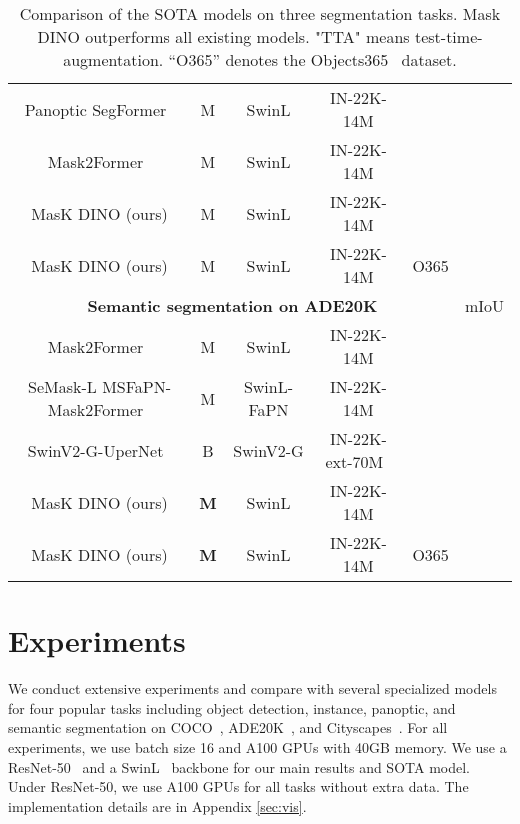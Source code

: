 \documentclass[10pt,twocolumn,letterpaper]{article}
\begin{document}
\begin{table*}[t]
\begin{adjustbox}{width=0.9\textwidth,center}
\begin{tabular}{c|c|c|c|c|cc}
        Panoptic SegFormer~\cite{li2021panoptic}& M & SwinL & IN-22K-14M &      & &   \\
         Mask2Former~\cite{cheng2021mask2former} & M & SwinL & IN-22K-14M &      &  &   \\
\hline
        MasK DINO (ours) & {M} & SwinL & IN-22K-14M &  &    \fontsize{7.0pt}{\baselineskip}\selectfont{(+0.6)} &   \\
MasK DINO (ours) & {M} & SwinL & IN-22K-14M & O365 &    \fontsize{7.0pt}{\baselineskip}\selectfont{(+1.6)} &   \\
        \midrule
        \multicolumn{5}{c}{{\textbf{Semantic segmentation on ADE20K}}}&\multicolumn{2}{c}{mIoU} \\
        \midrule
Mask2Former~\cite{cheng2021mask2former} & M & SwinL & IN-22K-14M  &      &  &   \\
SeMask-L MSFaPN-Mask2Former~\cite{jain2021semask} & M & SwinL-FaPN & IN-22K-14M &      & &   \\
        SwinV2-G-UperNet~\cite{liu2021swinv2} & B & SwinV2-G & IN-22K-ext-70M~\cite{liu2021swinv2} &  &    & \\
        \hline
        MasK DINO (ours) & \textbf{M} & SwinL & IN-22K-14M &  &     &   \\
        MasK DINO (ours) & \textbf{M} & SwinL & IN-22K-14M & O365 &     & \fontsize{7.0pt}{\baselineskip}\selectfont{(+0.9)}  \\
        \bottomrule
    \end{tabular}
    \end{adjustbox}
\caption{Comparison of the SOTA models on three segmentation tasks. Mask DINO outperforms all existing models. "TTA" means test-time-augmentation.
``O365''  denotes the  Objects365~\cite{shao2019objects365} dataset. 
    }
    \label{tab:sota}
    \vspace{-.3cm}
\end{table*}



%
 \section{Experiments}
We conduct extensive experiments and compare with several specialized models for four popular tasks including object detection, instance, panoptic, and semantic segmentation on COCO~\cite{lin2015microsoft}, ADE20K~\cite{zhou2017scene}, and Cityscapes~\cite{cordts2016cityscapes}. For all experiments, we use batch size 16 and A100 GPUs with 40GB memory. We use a ResNet-50~\cite{he2015deep} and a SwinL~\cite{liu2021swin} backbone for our main results and SOTA model.  Under ResNet-50, we use  A100 GPUs for all tasks without extra data.
The implementation details are in Appendix \ref{sec:vis}.
\end{document}
